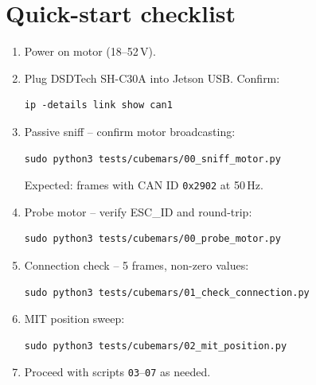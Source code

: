 \documentclass[11pt,a4paper]{article}
\begin{document}
\section{Quick-start checklist}
\label{sec:checklist}

\begin{enumerate}
  \item Power on motor (18--52\,V).
  \item Plug DSDTech SH-C30A into Jetson USB.  Confirm:
\begin{lstlisting}[numbers=none]
ip -details link show can1
\end{lstlisting}
  \item Passive sniff -- confirm motor broadcasting:
\begin{lstlisting}[numbers=none]
sudo python3 tests/cubemars/00_sniff_motor.py
\end{lstlisting}
  Expected: frames with CAN ID \texttt{0x2902} at 50\,Hz.
  \item Probe motor -- verify ESC\_ID and round-trip:
\begin{lstlisting}[numbers=none]
sudo python3 tests/cubemars/00_probe_motor.py
\end{lstlisting}
  \item Connection check -- 5 frames, non-zero values:
\begin{lstlisting}[numbers=none]
sudo python3 tests/cubemars/01_check_connection.py
\end{lstlisting}
  \item MIT position sweep:
\begin{lstlisting}[numbers=none]
sudo python3 tests/cubemars/02_mit_position.py
\end{lstlisting}
  \item Proceed with scripts \texttt{03}--\texttt{07} as needed.
\end{enumerate}
\end{document}
